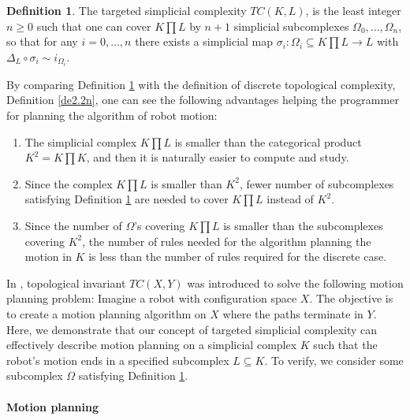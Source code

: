 \documentclass[preprint,11pt %
]{hjm1}
\theoremstyle{definition}
\newtheorem{definition}[theorem]{Definition}
\begin{document}
\begin{definition}\label{def}
The targeted simplicial complexity $TC(K,L)$, is the least integer $n\geq 0$ such that one can cover $K\prod  L$ by $n+1$ simplicial subcomplexes $\Omega _0,...,\Omega _n$, so that for any $i=0,...,n$ there exists a simplicial map $\sigma _i:\Omega _i \subseteq K\prod  L\to L$ with $\Delta _L \circ \sigma _i\sim i_{\Omega _i}$.
\end{definition}


By comparing Definition \ref{def} with the definition of discrete topological complexity, Definition \ref{de2.2n}, one can see the following advantages helping the programmer for planning the algorithm of robot motion:
\begin{enumerate}
\item
The simplicial complex $K \prod L$ is smaller than  the categorical product $K^2 = K \prod K$, and then it is naturally easier to compute and study.

\item
Since the complex $K \prod L$ is smaller than $K^2$, fewer number of subcomplexes satisfying Definition \ref{def} are needed to cover $K \prod L$ instead of $K^2$.

\item
Since the number of $\Omega$'s covering $K \prod L$ is smaller than the subcomplexes covering $K^2$, the number of rules needed for the algorithm planning the motion in $K$ is less than the number of rules required for the discrete case.
\end{enumerate} 


In \cite{rel}, topological invariant $TC(X,Y)$ was introduced to solve the following motion planning problem: Imagine a robot with configuration space $X$. The objective is to create a motion planning algorithm on $X$ where the paths terminate in $Y$. Here, we demonstrate that our concept of targeted simplicial complexity can effectively describe  motion planning on a simplicial complex $K$ such that the robot's motion ends in a specified subcomplex $L\subseteq K$. To verify, we consider some subcomplex $\Omega$ satisfying Definition \ref{def}.


\paragraph*{Motion planning}\label{Motion}
\end{document}
